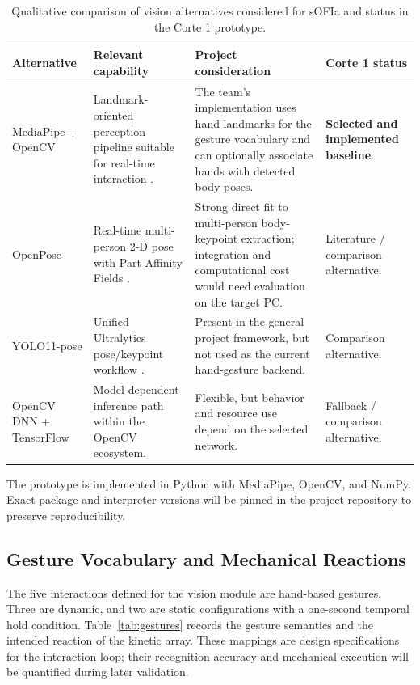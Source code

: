 \documentclass[lettersize,journal]{IEEEtran}
\begin{document}
\begin{table}[H]
\centering
\caption{Qualitative comparison of vision alternatives considered for sOFIa and status in the Corte 1 prototype.}
\label{tab:pose-comparison}
\scriptsize
\setlength{\tabcolsep}{2.2pt}
\begin{tabularx}{\columnwidth}{p{1.35cm}p{2.15cm}p{2.15cm}X}
\hline
\textbf{Alternative} & \textbf{Relevant capability} & \textbf{Project consideration} & \textbf{Corte 1 status} \\
\hline
MediaPipe + OpenCV & Landmark-oriented perception pipeline suitable for real-time interaction \cite{lugaresi2019mediapipe}. & The team's implementation uses hand landmarks for the gesture vocabulary and can optionally associate hands with detected body poses. & \textbf{Selected and implemented baseline}. \\
OpenPose & Real-time multi-person 2-D pose with Part Affinity Fields \cite{cao2017openpose}. & Strong direct fit to multi-person body-keypoint extraction; integration and computational cost would need evaluation on the target PC. & Literature / comparison alternative. \\
YOLO11-pose & Unified Ultralytics pose/keypoint workflow \cite{jocher2024yolo11}. & Present in the general project framework, but not used as the current hand-gesture backend. & Comparison alternative. \\
OpenCV DNN + TensorFlow & Model-dependent inference path within the OpenCV ecosystem. & Flexible, but behavior and resource use depend on the selected network. & Fallback / comparison alternative. \\
\hline
\end{tabularx}
\end{table}

The prototype is implemented in Python with MediaPipe, OpenCV, and NumPy. Exact package and interpreter versions will be pinned in the project repository to preserve reproducibility.

\subsection{Gesture Vocabulary and Mechanical Reactions}
\label{sec:gesture-vocabulary}

The five interactions defined for the vision module are hand-based gestures. Three are dynamic, and two are static configurations with a one-second temporal hold condition. Table~\ref{tab:gestures} records the gesture semantics and the intended reaction of the kinetic array. These mappings are design specifications for the interaction loop; their recognition accuracy and mechanical execution will be quantified during later validation.
\end{document}
